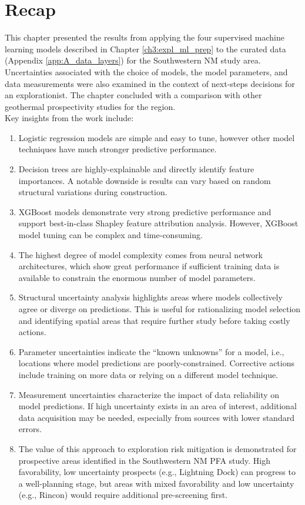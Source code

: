 \section{Recap}\label{ch5:recap}
This chapter presented the results from applying the four supervised machine learning models described in Chapter \ref{ch3:expl_ml_prep} to the curated data (Appendix \ref{app:A_data_layers}) for the Southwestern NM study area. Uncertainties associated with the choice of models, the model parameters, and data measurements were also examined in the context of next-steps decisions for an explorationist. The chapter concluded with a comparison with other geothermal prospectivity studies for the region.
\\
Key insights from the work include:
\begin{enumerate}
    \item Logistic regression models are simple and easy to tune, however other model techniques have much stronger predictive performance.
    \item Decision trees are highly-explainable and directly identify feature importances. A notable downside is results can vary based on random structural variations during construction.
    \item XGBoost models demonstrate very strong predictive performance and support best-in-class Shapley feature attribution analysis. However, XGBoost model tuning can be complex and time-consuming.
    \item The highest degree of model complexity comes from neural network architectures, which show great performance if sufficient training data is available to constrain the enormous number of model parameters.
    \item Structural uncertainty analysis highlights areas where models collectively agree or diverge on predictions. This is useful for rationalizing model selection and identifying spatial areas that require further study before taking costly actions.
    \item Parameter uncertainties indicate the ``known unknowns'' for a model, i.e., locations where model predictions are poorly-constrained. Corrective actions include training on more data or relying on a different model technique.
    \item Measurement uncertainties characterize the impact of data reliability on model predictions. If high uncertainty exists in an area of interest, additional data acquisition may be needed, especially from sources with lower standard errors. 
    \item The value of this approach to exploration risk mitigation is demonstrated for  prospective areas identified in the Southwestern NM PFA study. High favorability, low uncertainty prospects (e.g., Lightning Dock) can progress to a well-planning stage, but areas with mixed favorability and low uncertainty (e.g., Rincon) would require additional pre-screening first.

\end{enumerate}
